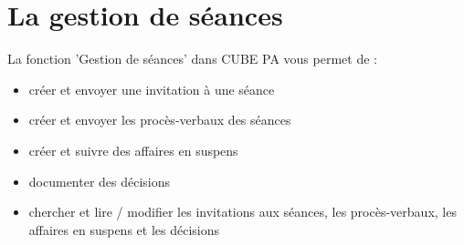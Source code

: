 
\clearpage
\section{La gestion de séances}

La fonction 'Gestion de séances' dans CUBE PA vous permet de :


\begin{itemize}
\item
créer et envoyer une invitation à une séance
\item
créer et envoyer les procès-verbaux des séances
\item
créer et suivre des affaires en suspens
\item
documenter des décisions
\item
chercher et lire / modifier les invitations aux séances, les procès-verbaux, les affaires en suspens et les décisions
\end{itemize}

\vspace{2cm}

